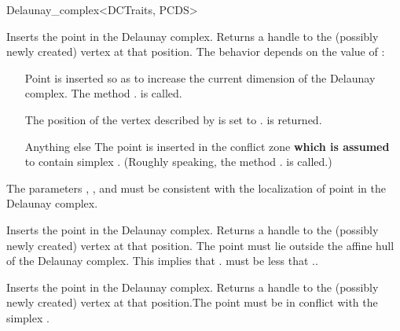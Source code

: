 \begin{ccRefClass}{Delaunay_complex<DCTraits, PCDS>}
\begin{ccAdvanced}

{Inserts the point  in the Delaunay complex. Returns a handle to the
(possibly newly created) vertex at that position. The behavior depends on the
value of :\begin{itemize} \item[\ccc{OUTSIDE_AFFINE_HULL}] Point
 is inserted so as to increase the current dimension of the Delaunay
complex. The method \ccVar. is called.
\item[\ccc{ON_VERTEX}] The position of the vertex  described by 
is set to .  is returned. \item[Anything else] The point 
is inserted in the conflict zone \textbf{which is assumed} to contain simplex
. (Roughly speaking, the method \ccVar.
is called.)\end{itemize} \ccPrecond The parameters , , 
and  must be consistent with the localization of point  in the
Delaunay complex.}

{Inserts the point  in the Delaunay complex. Returns a handle to the
(possibly newly created) vertex at that position. \ccPrecond The point 
must lie outside the affine hull of the Delaunay complex. This implies that
\ccVar. must be less that
\ccVar..}

{Inserts the point  in the Delaunay complex. Returns a handle to the
(possibly newly created) vertex at that position.\ccPrecond The point 
must be in conflict with the simplex .}

\end{ccAdvanced}



\begin{ccAdvanced}


\end{ccAdvanced}

\end{ccRefClass}

